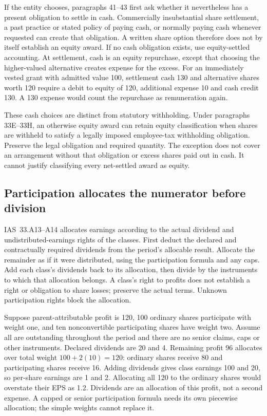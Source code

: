 If the entity chooses, paragraphs 41--43 first ask whether it nevertheless has a present obligation to settle in cash. Commercially insubstantial share settlement, a past practice or stated policy of paying cash, or normally paying cash whenever requested can create that obligation. A written share option therefore does not by itself establish an equity award. If no cash obligation exists, use equity-settled accounting. At settlement, cash is an equity repurchase, except that choosing the higher-valued alternative creates expense for the excess. For an immediately vested grant with admitted value 100, settlement cash 130 and alternative shares worth 120 require a debit to equity of 120, additional expense 10 and cash credit 130. A 130 expense would count the repurchase as remuneration again.

These cash choices are distinct from statutory withholding. Under paragraphs 33E--33H, an otherwise equity award can retain equity classification when shares are withheld to satisfy a legally imposed employee-tax withholding obligation. Preserve the legal obligation and required quantity. The exception does not cover an arrangement without that obligation or excess shares paid out in cash. It cannot justify classifying every net-settled award as equity.



\hypertarget{participation-allocates-the-numerator-before-division}{%
\subsection{Participation allocates the numerator before division}\label{participation-allocates-the-numerator-before-division}}

IAS~33.A13--A14 \citep[IAS~33.A13--A16]{eu20231803} allocates earnings according to the actual dividend and undistributed-earnings rights of the classes. First deduct the declared and contractually required dividends from the period's allocable result. Allocate the remainder as if it were distributed, using the participation formula and any caps. Add each class's dividends back to its allocation, then divide by the instruments to which that allocation belongs. A class's right to profits does not establish a right or obligation to share losses; preserve the actual terms. Unknown participation rights block the allocation.

Suppose parent-attributable profit is 120, 100 ordinary shares participate with weight one, and ten nonconvertible participating shares have weight two. Assume all are outstanding throughout the period and there are no senior claims, caps or other instruments. Declared dividends are 20 and 4. Remaining profit 96 allocates over total weight \(100+2(10)=120\): ordinary shares receive 80 and participating shares receive 16. Adding dividends gives class earnings 100 and 20, so per-share earnings are 1 and 2. Allocating all 120 to the ordinary shares would overstate their EPS as 1.2. Dividends are an allocation of this profit, not a second expense. A capped or senior participation formula needs its own piecewise allocation; the simple weights cannot replace it.

